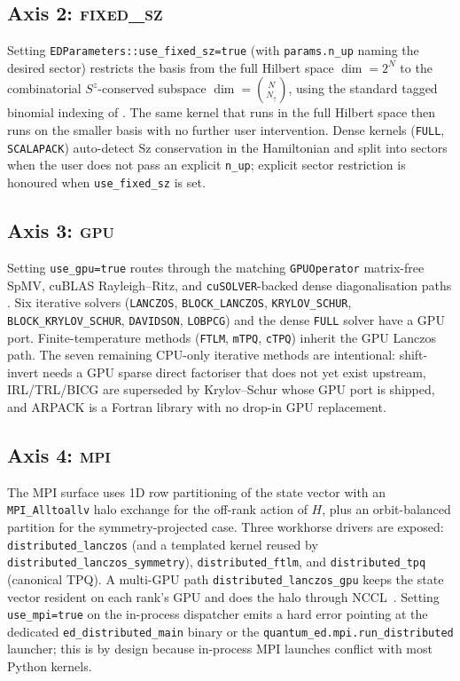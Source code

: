 \documentclass[submission, PhysCodeb]{SciPost}
\begin{document}
\subsection{Axis 2: \textsc{fixed\_sz}}
\label{sec:axes-fixedsz}
Setting \texttt{EDParameters::use\_fixed\_sz=true} (with
\texttt{params.n\_up} naming the desired sector) restricts the basis
from the full Hilbert space $\dim = 2^N$ to the combinatorial
$S^z$-conserved subspace
$\dim = \binom{N}{N_{\uparrow}}$, using the standard tagged binomial
indexing of \cite{Lin1990Hashing}. The same kernel that runs in the
full Hilbert space then runs on the smaller basis with no further
user intervention. Dense kernels (\texttt{FULL}, \texttt{SCALAPACK})
auto-detect Sz conservation in the Hamiltonian and split into
sectors when the user does not pass an explicit \texttt{n\_up};
explicit sector restriction is honoured when \texttt{use\_fixed\_sz}
is set.

\subsection{Axis 3: \textsc{gpu}}
\label{sec:axes-gpu}
Setting \texttt{use\_gpu=true} routes through the matching
\texttt{GPUOperator} matrix-free SpMV, cuBLAS Rayleigh--Ritz, and
\texttt{cuSOLVER}-backed dense diagonalisation paths
\cite{NVIDIAcuBLAS,NVIDIAcuSPARSE,NVIDIAcuSOLVER}. Six iterative
solvers (\texttt{LANCZOS}, \texttt{BLOCK\_LANCZOS},
\texttt{KRYLOV\_SCHUR}, \texttt{BLOCK\_KRYLOV\_SCHUR},
\texttt{DAVIDSON}, \texttt{LOBPCG}) and the dense \texttt{FULL}
solver have a GPU port. Finite-temperature methods (\texttt{FTLM},
\texttt{mTPQ}, \texttt{cTPQ}) inherit the GPU Lanczos path. The seven
remaining CPU-only iterative methods are intentional: shift-invert
needs a GPU sparse direct factoriser that does not yet exist
upstream, IRL/TRL/BICG are superseded by Krylov--Schur whose GPU port
is shipped, and ARPACK is a Fortran library with no drop-in GPU
replacement.

\subsection{Axis 4: \textsc{mpi}}
\label{sec:axes-mpi}
The MPI surface uses 1D row partitioning of the state vector with an
\texttt{MPI\_Alltoallv} halo exchange for the off-rank action of
$H$, plus an orbit-balanced partition for the symmetry-projected
case. Three workhorse drivers are exposed:
\texttt{distributed\_lanczos} (and a templated kernel reused by
\texttt{distributed\_lanczos\_symmetry}),
\texttt{distributed\_ftlm}, and \texttt{distributed\_tpq} (canonical
TPQ). A multi-GPU path \texttt{distributed\_lanczos\_gpu} keeps the
state vector resident on each rank's GPU and does the halo through
NCCL~\cite{NVIDIANCCL}. Setting \texttt{use\_mpi=true} on the
in-process dispatcher emits a hard error pointing at the dedicated
\texttt{ed\_distributed\_main} binary or the
\texttt{quantum\_ed.mpi.run\_distributed} launcher; this is by design
because in-process MPI launches conflict with most Python kernels.
\end{document}
